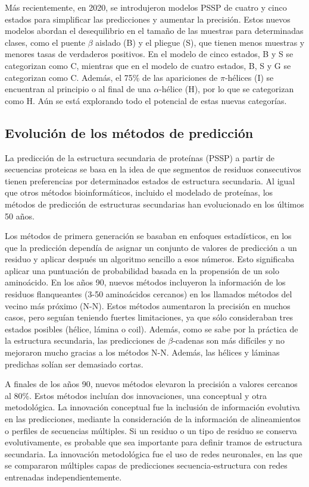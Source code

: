 Más recientemente, en 2020, se introdujeron modelos PSSP de cuatro y cinco estados para simplificar las predicciones y aumentar la precisión. Estos nuevos modelos abordan el desequilibrio en el tamaño de las muestras para determinadas clases, como el puente $\beta$ aislado (B) y el pliegue (S), que tienen menos muestras y menores tasas de verdaderos positivos. En el modelo de cinco estados, B y S se categorizan como C, mientras que en el modelo de cuatro estados, B, S y G se categorizan como C. Además, el 75\% de las apariciones de $\pi$-hélices (I) se encuentran al principio o al final de una $\alpha$-hélice (H), por lo que se categorizan como H. Aún se está explorando todo el potencial de estas nuevas categorías.

\subsection{Evolución de los métodos de predicción}
La predicción de la estructura secundaria de proteínas (PSSP) a partir de secuencias proteicas se basa en la idea de que segmentos de residuos consecutivos tienen preferencias por determinados estados de estructura secundaria. Al igual que otros métodos bioinformáticos, incluido el modelado de proteínas, los métodos de predicción de estructuras secundarias han evolucionado en los últimos 50 años.

Los métodos de primera generación se basaban en enfoques estadísticos, en los que la predicción dependía de asignar un conjunto de valores de predicción a un residuo y aplicar después un algoritmo sencillo a esos números. Esto significaba aplicar una puntuación de probabilidad basada en la propensión de un solo aminoácido. En los años 90, nuevos métodos incluyeron la información de los residuos flanqueantes (3-50 aminoácidos cercanos) en los llamados métodos del vecino más próximo (N-N). Estos métodos aumentaron la precisión en muchos casos, pero seguían teniendo fuertes limitaciones, ya que sólo consideraban tres estados posibles (hélice, lámina o coil). Además, como se sabe por la práctica de la estructura secundaria, las predicciones de $\beta$-cadenas son más difíciles y no mejoraron mucho gracias a los métodos N-N. Además, las hélices y láminas predichas solían ser demasiado cortas.

A finales de los años 90, nuevos métodos elevaron la precisión a valores cercanos al 80\%. Estos métodos incluían dos innovaciones, una conceptual y otra metodológica. La innovación conceptual fue la inclusión de información evolutiva en las predicciones, mediante la consideración de la información de alineamientos o perfiles de secuencias múltiples. Si un residuo o un tipo de residuo se conserva evolutivamente, es probable que sea importante para definir tramos de estructura secundaria. La innovación metodológica fue el uso de redes neuronales, en las que se compararon múltiples capas de predicciones secuencia-estructura con redes entrenadas independientemente.

